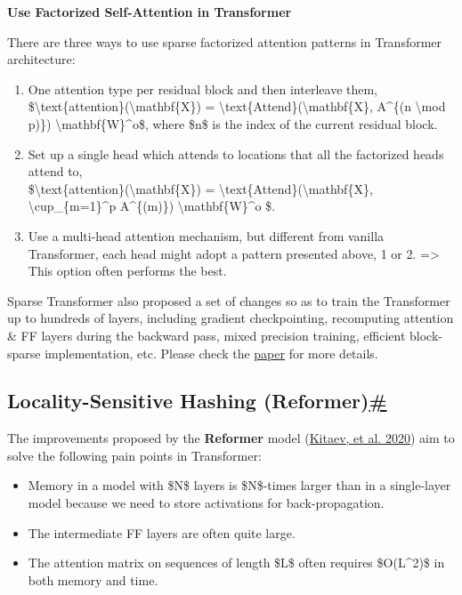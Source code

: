 \textbf{Use Factorized Self-Attention in Transformer}

There are three ways to use sparse factorized attention patterns in Transformer architecture:

\begin{enumerate}
\tightlist
\item
  One attention type per residual block and then interleave them,\\
  \$\textbackslash text\{attention\}(\textbackslash mathbf\{X\}) = \textbackslash text\{Attend\}(\textbackslash mathbf\{X\}, A\^{}\{(n \textbackslash mod p)\}) \textbackslash mathbf\{W\}\^{}o\$, where \$n\$ is the index of the current residual block.
\item
  Set up a single head which attends to locations that all the factorized heads attend to,\\
  \$\textbackslash text\{attention\}(\textbackslash mathbf\{X\}) = \textbackslash text\{Attend\}(\textbackslash mathbf\{X\}, \textbackslash cup\_\{m=1\}\^{}p A\^{}\{(m)\}) \textbackslash mathbf\{W\}\^{}o \$.
\item
  Use a multi-head attention mechanism, but different from vanilla Transformer, each head might adopt a pattern presented above, 1 or 2. =\textgreater{} This option often performs the best.
\end{enumerate}

Sparse Transformer also proposed a set of changes so as to train the Transformer up to hundreds of layers, including gradient checkpointing, recomputing attention \& FF layers during the backward pass, mixed precision training, efficient block-sparse implementation, etc. Please check the \href{https://arxiv.org/abs/1904.10509}{paper} for more details.

\subsection{\texorpdfstring{Locality-Sensitive Hashing (Reformer)\hyperref[locality-sensitive-hashing-reformer]{\#}}{Locality-Sensitive Hashing (Reformer)\#}}\label{locality-sensitive-hashing-reformer}

The improvements proposed by the \textbf{Reformer} model (\href{https://arxiv.org/abs/2001.04451}{Kitaev, et al. 2020}) aim to solve the following pain points in Transformer:

\begin{itemize}
\tightlist
\item
  Memory in a model with \$N\$ layers is \$N\$-times larger than in a single-layer model because we need to store activations for back-propagation.
\item
  The intermediate FF layers are often quite large.
\item
  The attention matrix on sequences of length \$L\$ often requires \$O(L\^{}2)\$ in both memory and time.
\end{itemize}

